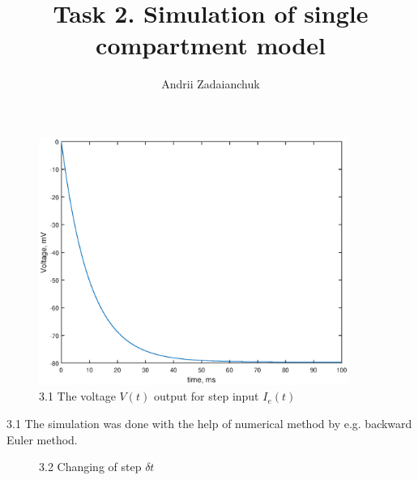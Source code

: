 \documentclass[]{report}
\title{Task 2. Simulation of single compartment model}
\author{Andrii Zadaianchuk}
\begin{document}
\maketitle

\begin{figure}[h!]
	\centering
	\includegraphics[width=0.9\textwidth]{exp1.eps}
	\caption*{3.1 The voltage $V(t)$ output for step input $I_e(t)$}
	\label{fig:exp1}
\end{figure}
3.1 The simulation was done with the help of numerical method by e.g. backward Euler method.

\begin{figure}[h!]
	\centering
	\hfill
	\caption*{3.2 Changing of step $\delta t$}
\end{figure}
\end{document}
